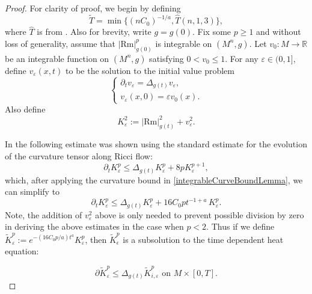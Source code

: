 \documentclass[10pt,a4paper]{amsart}
\newcommand{\Rm}{\mathrm{Rm}}
\begin{document}
\begin{proof}
For clarity of proof, we begin by defining 
\[
\widetilde T=\min\{(nC_0)^{-1/a},\widehat T(n,1,3)\},
\]
where $\widehat T$ is from {\cite[Theorem 1.1]{LeeTam}}. Also for brevity, write $g=g(0)$. Fix some $p\geq 1$ and without loss of generality, assume that $|\Rm|_{g(0)}^p$ is integrable on $(M^n, g)$. Let $v_0 : M \to \mathbb{R}$ be an integrable function on $(M^n, g)$ satisfying $0 < v_0 \le 1$. For any $\varepsilon \in (0,1]$, define $v_{\varepsilon}(x, t)$ to be the solution to the initial value problem
\[
\begin{cases}
\partial_t v_{\varepsilon} = \Delta_{g(t)} v_{\varepsilon},\\
v_{\varepsilon}(x, 0) = \varepsilon v_0(x).
\end{cases}
\]
Also define
\[
K_{\varepsilon}^2 := | \mathrm{Rm} |_{g(t)}^2 + v_{\varepsilon}^2.
\]


In {\cite[Lemma 2.1]{ChauMartens}} the following estimate was shown using the standard estimate for the evolution of the curvature tensor along Ricci flow:
\[
\partial_t K_{\varepsilon}^p \le \Delta_{g(t)} K_{\varepsilon}^p + 8 p K_{\varepsilon}^{p+1},
\]
which, after applying the curvature bound in \eqref{integrableCurveBoundLemma}, we can simplify to
\begin{equation}\label{evolOfKp}
\partial_t K_{\varepsilon}^p \le \Delta_{g(t)} K_{\varepsilon}^p + 16C_0p t^{-1+a}\, K_{\varepsilon}^{p}.
\end{equation}
Note, the addition of $v_{\varepsilon}^2$ above is only needed to prevent possible division by zero in deriving the above estimates in the case when $p<2$.  Thus if we define $\widetilde K_{\varepsilon}^p:=e^{-(16C_0p/a)t^{a}}K_{\varepsilon}^p$, then $\widetilde K_\epsilon^p$ is a subsolution to the time dependent heat equation:  

\begin{equation}\label{upperlowerK}
\partial \widetilde K_{\varepsilon}^p  \le  \Delta_{g(t)} \widetilde K_{i,\varepsilon}^p \text{   on } M\times[0, T].
\end{equation}

    


\end{proof}
\end{document}
